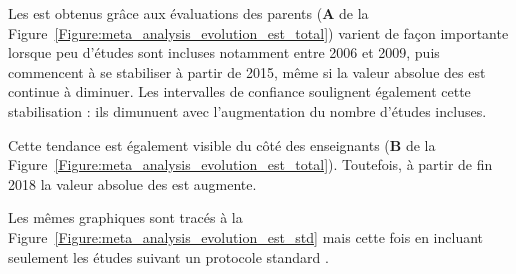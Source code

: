 \begin{itemize}
Les \gls{est} obtenus grâce aux évaluations des parents (\textbf{A} de la Figure~\ref{Figure:meta_analysis_evolution_est_total}) varient de façon 
importante lorsque peu d'études sont incluses notamment entre 2006 et 2009, puis commencent à se stabiliser à 
partir de 2015, même si la valeur absolue des \gls{est} continue à diminuer. Les intervalles de confiance soulignent également cette stabilisation : ils dimunuent 
avec l'augmentation du nombre d'études incluses. 

Cette tendance est également visible du côté des enseignants (\textbf{B} de la Figure~\ref{Figure:meta_analysis_evolution_est_total}). Toutefois, à partir 
de fin 2018 la valeur absolue des \gls{est} augmente.

Les mêmes graphiques sont tracés à la Figure~\ref{Figure:meta_analysis_evolution_est_std} mais cette fois en incluant seulement 
les études suivant un protocole standard \citep{Arns2014}.


\end{itemize}
